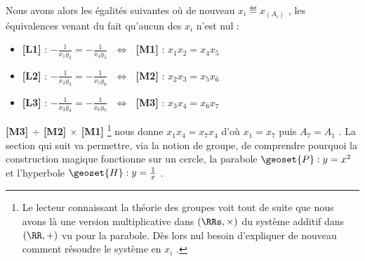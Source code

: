 \medskip

Nous avons alors les égalités suivantes où de nouveau $x_i \eqdef x_{(A_i)}$ , les équivalences venant du fait qu'aucun des $x_i$ n'est nul :
\begin{itemize}[label=\small\textbullet]
	\item \textbf{[L1]} : 
	      $- \frac{1}{x_1 y_2} = - \frac{1}{x_4 y_5}$
	      $\,\, \Longleftrightarrow \,\,$
	      \textbf{[M1]} : 
	      $x_1 x_{2} = x_{4} x_{5}$

	\item \textbf{[L2]} : 
	      $- \frac{1}{x_2 y_3} = - \frac{1}{x_5 y_6}$
	      $\,\, \Longleftrightarrow \,\,$
	      \textbf{[M2]} : 
	      $x_2 x_{3} = x_{5} x_{6}$

	\item \textbf{[L3]} : 
	      $- \frac{1}{x_3 y_4} = - \frac{1}{x_6 y_7}$
	      $\,\, \Longleftrightarrow \,\,$
	      \textbf{[M3]} : 
	      $x_3 x_{4} = x_{6} x_{7}$
\end{itemize}


\medskip

\textbf{[M3] $\div$ [M2] $\times$ [M1]}
\footnote{
	Le lecteur connaissant la théorie des groupes voit tout de suite que nous avons là une version multiplicative dans $(\RRs , \times)$ du système additif dans $(\RR , +)$ vu pour la parabole.
	Dès lors nul besoin d'expliquer de nouveau comment résoudre le système en $x_i$ .
}
nous donne $x_1 x_4 = x_7 x_4$ d'où $x_1 = x_7$ puis $A_7 = A_1$ .
La section qui suit va permettre, via la notion de groupe, de comprendre pourquoi la construction magique fonctionne sur un cercle, la parabole $\geoset{P} : y = x^2$ et l'hyperbole $\geoset{H} : y = \frac{1}{x}$ .
